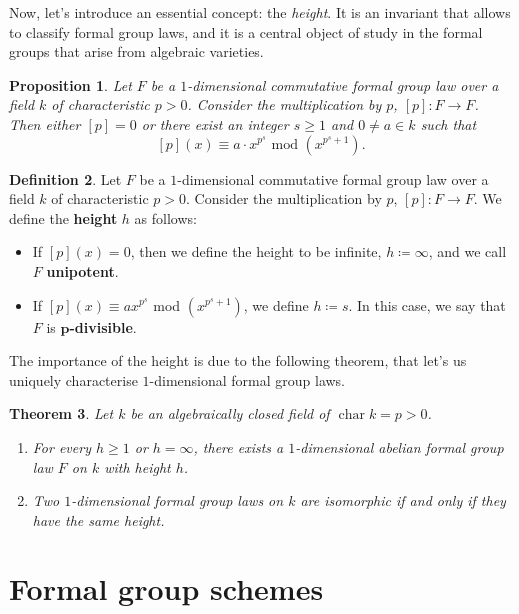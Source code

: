 \documentclass{report}
\DeclareMathOperator{\chara}{char}
\newtheorem{theorem}{Theorem}[chapter]
\newtheorem{proposition}[theorem]{Proposition}
\theoremstyle{definition}
\newtheorem{definition}[theorem]{Definition}
\begin{document}
Now, let's introduce an essential concept: the \emph{height}. It is an invariant that allows to classify formal group laws, and it is a central object of study in the formal groups that arise from algebraic varieties.

\begin{proposition}
Let $F$ be a $1$-dimensional commutative formal group law over a field $k$ of characteristic $p>0$. Consider the multiplication by $p$, $[p]:F\rightarrow F$. Then either $[p]=0$ or there exist an integer $s\geq1$ and $0\neq a\in k$ such that
\[[p](x)\equiv a\cdot x^{p^s}\text{ mod }(x^{p^s+1}).\]
\end{proposition}

\begin{definition}
Let $F$ be a $1$-dimensional commutative formal group law over a field $k$ of characteristic $p>0$. Consider the multiplication by $p$, $[p]:F\rightarrow F$. We define the \textbf{height} $h$ as follows:
\begin{itemize}
\item If $[p](x)=0$, then we define the height to be infinite, $h\coloneqq\infty$, and we call $F$ \textbf{unipotent}.

\item If $[p](x)\equiv ax^{p^s}$ mod $(x^{p^s+1})$, we define $h\coloneqq s$. In this case, we say that $F$ is \textbf{$\boldsymbol{p}$-divisible}.
\end{itemize}
\end{definition}

The importance of the height is due to the following theorem, that let's us uniquely characterise $1$-dimensional formal group laws.

\begin{theorem}
Let $k$ be an algebraically closed field of $\chara k=p>0$.
\begin{enumerate}
\item \cite[Corollaire~1]{lazard1955groupes} For every $h\geq1$ or $h=\infty$, there exists a $1$-dimensional abelian formal group law $F$ on $k$ with height $h$.
\item \cite[Th\'{e}or\`{e}me~IV]{lazard1955groupes} Two $1$-dimensional formal group laws on $k$ are isomorphic if and only if they have the same height.
\end{enumerate}
\end{theorem}

\section{Formal group schemes}
\end{document}
